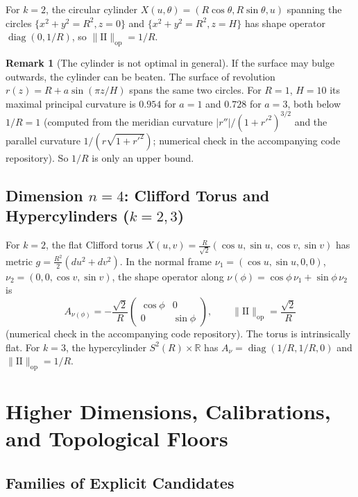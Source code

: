 \documentclass[11pt,reqno]{amsart}
\theoremstyle{definition}
\newtheorem{remark}[theorem]{Remark}
\providecommand{\R}{\mathbb{R}}
\providecommand{\II}{\mathrm{I\!I}}
\newcommand{\op}{\mathrm{op}}
\numberwithin{equation}{section}
\providecommand{\II}{\mathrm{II}}
\providecommand{\R}{\mathbb{R}}
\begin{document}
For $k=2$, the circular cylinder $X(u,\theta) = (R\cos\theta, R\sin\theta, u)$ spanning the circles $\{x^2+y^2 = R^2, z = 0\}$ and $\{x^2+y^2=R^2, z=H\}$ has shape operator $\operatorname{diag}(0, 1/R)$, so $\|\II\|_{\op} = 1/R$.

\begin{remark}[The cylinder is not optimal in general]
If the surface may bulge outwards, the cylinder can be beaten. The surface of revolution $r(z) = R + a\sin(\pi z/H)$ spans the same two circles. For $R = 1$, $H = 10$ its maximal principal curvature is $0.954$ for $a = 1$ and $0.728$ for $a = 3$, both below $1/R = 1$ (computed from the meridian curvature $|r''|/(1+r'^2)^{3/2}$ and the parallel curvature $1/(r\sqrt{1+r'^2})$; numerical check in the accompanying code repository). So $1/R$ is only an upper bound.
\end{remark}

\subsection{Dimension \texorpdfstring{$n=4$}{n=4}: Clifford Torus and Hypercylinders \texorpdfstring{($k=2, 3$)}{(k=2, 3)}}
For $k=2$, the flat Clifford torus $X(u, v) = \frac{R}{\sqrt{2}} (\cos u, \sin u, \cos v, \sin v)$ has metric $g = \frac{R^2}{2}(du^2 + dv^2)$. In the normal frame $\nu_1 = (\cos u, \sin u, 0, 0)$, $\nu_2 = (0,0,\cos v, \sin v)$, the shape operator along $\nu(\phi) = \cos\phi\, \nu_1 + \sin\phi\, \nu_2$ is
\begin{equation}
A_{\nu(\phi)} = -\frac{\sqrt{2}}{R} \begin{pmatrix} \cos\phi & 0 \\ 0 & \sin\phi \end{pmatrix}, \qquad \|\II\|_{\op} = \frac{\sqrt{2}}{R}
\end{equation}
(numerical check in the accompanying code repository). The torus is intrinsically flat. For $k=3$, the hypercylinder $S^2(R) \times \R$ has $A_\nu = \operatorname{diag}(1/R, 1/R, 0)$ and $\|\II\|_{\op} = 1/R$.

\section{Higher Dimensions, Calibrations, and Topological Floors}

\subsection{Families of Explicit Candidates}
\end{document}
